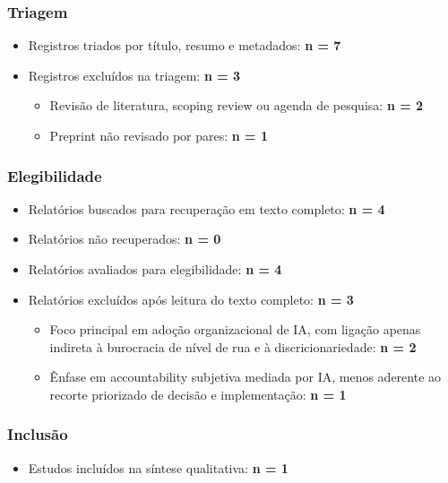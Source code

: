 \documentclass[12pt]{article}
\begin{document}
\subsubsection{Triagem}
\label{sec:org03fb0ca}
\begin{itemize}
\item Registros triados por título, resumo e metadados: \textbf{n = 7}
\item Registros excluídos na triagem: \textbf{n = 3}
\begin{itemize}
\item Revisão de literatura, scoping review ou agenda de pesquisa: \textbf{n = 2}
\item Preprint não revisado por pares: \textbf{n = 1}
\end{itemize}
\end{itemize}

\subsubsection{Elegibilidade}
\label{sec:orgdaef0e9}
\begin{itemize}
\item Relatórios buscados para recuperação em texto completo: \textbf{n = 4}
\item Relatórios não recuperados: \textbf{n = 0}

\item Relatórios avaliados para elegibilidade: \textbf{n = 4}
\item Relatórios excluídos após leitura do texto completo: \textbf{n = 3}
\begin{itemize}
\item Foco principal em adoção organizacional de IA, com ligação apenas indireta à burocracia de nível de rua e à discricionariedade: \textbf{n = 2}
\item Ênfase em accountability subjetiva mediada por IA, menos aderente ao recorte priorizado de decisão e implementação: \textbf{n = 1}
\end{itemize}
\end{itemize}

\subsubsection{Inclusão}
\label{sec:orgc9b47a2}
\begin{itemize}
\item Estudos incluídos na síntese qualitativa: \textbf{n = 1}
\end{itemize}
\end{document}
